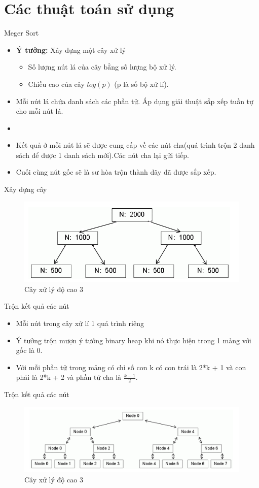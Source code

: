 \documentclass{beamer}
\newcommand{\bi}{\begin{itemize}}
\newcommand{\ei}{\end{itemize}}
\begin{document}
\section{Các thuật toán sử dụng}
\begin{frame}{Meger Sort}
\bi
\item \textbf{Ý tưởng:} Xây dựng một cây xử lý
\bi
\item Số lượng nút lá của cây bằng số lượng bộ xử lý.
\item Chiều cao của cây $log(p)$ (p là số bộ xử lí).
\ei
\item Mỗi nút lá chứa danh sách các phần tử. Áp dụng giải thuật sắp xếp tuần tự cho mỗi nút lá.
\item 
\item Kết quả ở mỗi nút lá sẽ được cung cấp về các nút cha(quá trình trộn 2 danh sách để được 1 danh sách mới).Các nút cha lại gửi tiếp.
\item Cuối cùng nút gốc sẽ là sư hòa trộn thành dãy đã được sắp xếp.
\ei
\end{frame}
\begin{frame}{Xây dựng cây}
\begin{figure}[H]
\includegraphics[scale=0.6]{img1.png}
\caption{Cây xử lý độ cao 3}
\end{figure}
\end{frame}
\begin{frame}{Trộn kết quả các nút}
\bi
\item Mỗi nút trong cây xử lí 1 quá trình riêng
\item Ý tưởng trộn mượn ý tưởng binary heap khi nó thực hiện trong 1 mảng với gốc là 0.
\item Với mỗi phần tử trong mảng có chỉ số con k có con trái là 2*k + 1 và con phải là 2*k + 2 và phần tử cha là $\frac{k-1}{2}$.
\ei
\end{frame}
\begin{frame}{Trộn kết quả các nút}
\begin{figure}[H]
\includegraphics[scale=0.4]{img2.png}
\caption{Cây xử lý độ cao 3}
\end{figure}
\end{frame}
\end{document}
